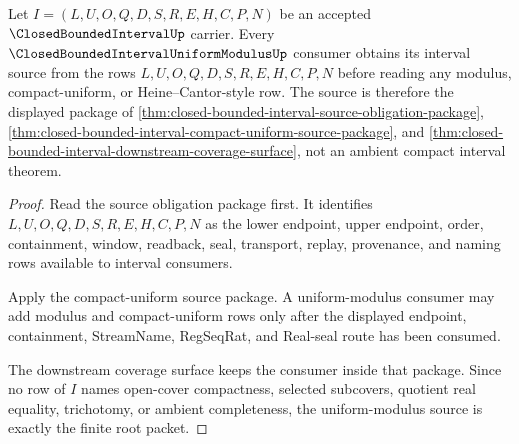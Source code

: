 \begin{theorem}
\label{thm:closed-bounded-interval-uniform-modulus-source}
Let $I=(L,U,O,Q,D,S,R,E,H,C,P,N)$ be an accepted $\ClosedBoundedIntervalUp$ carrier. Every $\ClosedBoundedIntervalUniformModulusUp$ consumer obtains its interval source from the rows $L,U,O,Q,D,S,R,E,H,C,P,N$ before reading any modulus, compact-uniform, or Heine--Cantor-style row. The source is therefore the displayed package of \autoref{thm:closed-bounded-interval-source-obligation-package}, \autoref{thm:closed-bounded-interval-compact-uniform-source-package}, and \autoref{thm:closed-bounded-interval-downstream-coverage-surface}, not an ambient compact interval theorem.
\end{theorem}
\begin{proof}
Read the source obligation package first. It identifies $L,U,O,Q,D,S,R,E,H,C,P,N$ as the lower endpoint, upper endpoint, order, containment, window, readback, seal, transport, replay, provenance, and naming rows available to interval consumers.

Apply the compact-uniform source package. A uniform-modulus consumer may add modulus and compact-uniform rows only after the displayed endpoint, containment, StreamName, RegSeqRat, and Real-seal route has been consumed.

The downstream coverage surface keeps the consumer inside that package. Since no row of $I$ names open-cover compactness, selected subcovers, quotient real equality, trichotomy, or ambient completeness, the uniform-modulus source is exactly the finite root packet.
\end{proof}

